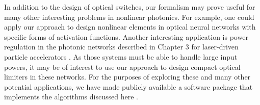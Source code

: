 In addition to the design of optical switches, our formalism may prove useful for many other interesting problems in nonlinear photonics.  For example, one could apply our approach to design nonlinear elements in optical neural networks \cite{shen2017deep} with specific forms of activation functions.  Another interesting application is power regulation in the photonic networks described in Chapter 3 for laser-driven particle accelerators \cite{hughes_-chip_2018}.  As those systems must be able to handle large input powers, it may be of interest to use our approach to design compact optical limiters in these networks. For the purposes of exploring these and many other potential applications, we have made publicly available a software package that implements the algorithms discussed here \cite{hughes2018fdfdpy}.

